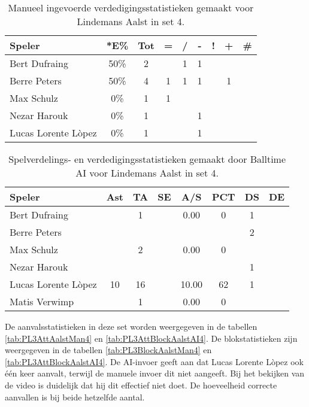 \begin{table}[ht!]
    \centering
    \scriptsize
    \begin{tabular}{|l|c|c|c|c|c|c|c|c|}
        \hline
        \textbf{Speler} & *E\% & Tot & = & / & - & ! & + & \# \\ \hline
        Bert Dufraing & 50\% & 2 &  & 1 & 1 &  &  & \\ 
        Berre Peters & 50\% & 4 & 1 & 1 & 1 & & 1 &  \\ 
        Max Schulz & 0\% & 1 & 1 &  &  &  &  & \\ 
        Nezar Harouk & 0\% & 1 &  &  & 1 &  &  &  \\ 
        Lucas Lorente Lòpez & 0\% & 1 &  &  & 1 &  &  & \\ \hline
    \end{tabular}
    \caption[Manueel ingevoerde verdedigingsstatistieken gemaakt voor Lindemans Aalst in set 4]{\label{tab:PL3DigAalstMan4}Manueel ingevoerde verdedigingsstatistieken gemaakt voor Lindemans Aalst in set 4.}
\end{table}

\begin{table}[ht!]
  \centering
  \scriptsize
  \begin{tabular}{|l|c|c|c|c|c|c|c|} \hline
    \textbf{Speler} & Ast & TA & SE & A/S & PCT & DS &  DE \\ \hline
    Bert Dufraing &  & 1 &  & 0.00 & 0 & 1 &  \\
    Berre Peters &   &   &   &   &   & 2 &   \\
    Max Schulz &  & 2 &  & 0.00 & 0 &   &   \\
    Nezar Harouk &   &   &   &   &   &  1 &   \\
    Lucas Lorente Lòpez & 10 & 16 &  & 10.00 & 62 & 1 &  \\
    Matis Verwimp &  & 1 &  & 0.00 & 0 &   &   \\ \hline
  \end{tabular}
 \caption[Spelverdelings- en verdedigingsstatistieken gemaakt door Balltime AI voor Lindemans Aalst in set 4]{\label{tab:PL3SetDigAalstAI4}Spelverdelings- en verdedigingsstatistieken gemaakt door Balltime AI voor Lindemans Aalst in set 4.}
\end{table}

De aanvalsstatistieken in deze set worden weergegeven in de tabellen \ref{tab:PL3AttAalstMan4} en \ref{tab:PL3AttBlockAalstAI4}. De blokstatistieken zijn weergegeven in de tabellen \ref{tab:PL3BlockAalstMan4} en \ref{tab:PL3AttBlockAalstAI4}. De AI-invoer geeft aan dat Lucas Lorente Lòpez ook één keer aanvalt, terwijl de manuele invoer dit niet aangeeft. Bij het bekijken van de video is duidelijk dat hij dit effectief niet doet. De hoeveelheid correcte aanvallen is bij beide hetzelfde aantal.

